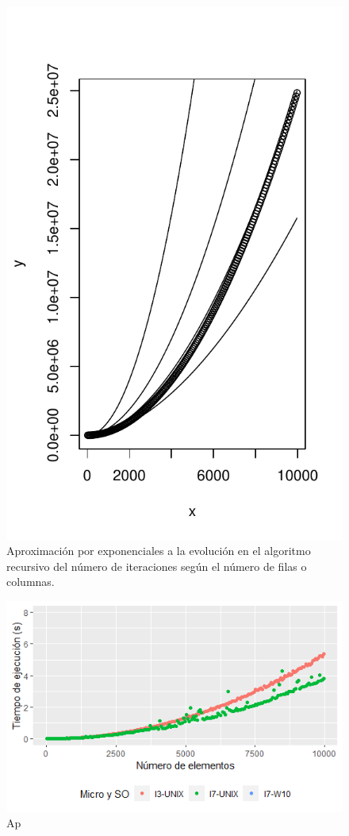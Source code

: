 \documentclass[12pt,a4paper]{article}
\begin{document}
\begin{figure}[h]
	\centering
	\includegraphics[scale=0.9]{fotos/iterations_rec_vs_pows}
	\caption{Aproximación por exponenciales a la evolución en el algoritmo recursivo del número de iteraciones según el número de filas o columnas.}
	\label{grafico3}
\end{figure}

\begin{figure}[h]
	\centering
	\includegraphics[scale=0.9]{fotos/Tiempos_recursivo1.png}
	\caption{Ap}
	\label{grafico4}
\end{figure}
\vspace{0.2cm}
\end{document}
